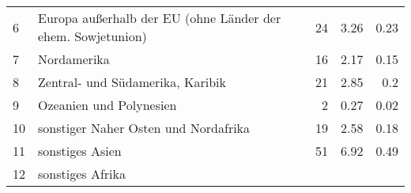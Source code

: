 \begin{longtable}{lXrrr}
     6 &
     \multicolumn{1}{X}{ Europa außerhalb der EU (ohne Länder der ehem. Sowjetunion)   } &


       \num{24} &
       \num[round-mode=places,round-precision=2]{3,26} &
         \num[round-mode=places,round-precision=2]{0,23} \\

     7 &
     \multicolumn{1}{X}{ Nordamerika   } &


       \num{16} &
       \num[round-mode=places,round-precision=2]{2,17} &
         \num[round-mode=places,round-precision=2]{0,15} \\

     8 &
     \multicolumn{1}{X}{ Zentral- und Südamerika, Karibik   } &


       \num{21} &
       \num[round-mode=places,round-precision=2]{2,85} &
         \num[round-mode=places,round-precision=2]{0,2} \\

     9 &
     \multicolumn{1}{X}{ Ozeanien und Polynesien   } &


       \num{2} &
       \num[round-mode=places,round-precision=2]{0,27} &
         \num[round-mode=places,round-precision=2]{0,02} \\

     10 &
     \multicolumn{1}{X}{ sonstiger Naher Osten und Nordafrika   } &


       \num{19} &
       \num[round-mode=places,round-precision=2]{2,58} &
         \num[round-mode=places,round-precision=2]{0,18} \\

     11 &
     \multicolumn{1}{X}{ sonstiges Asien   } &


       \num{51} &
       \num[round-mode=places,round-precision=2]{6,92} &
         \num[round-mode=places,round-precision=2]{0,49} \\

     12 &
     \multicolumn{1}{X}{ sonstiges Afrika   } &



\end{longtable}
